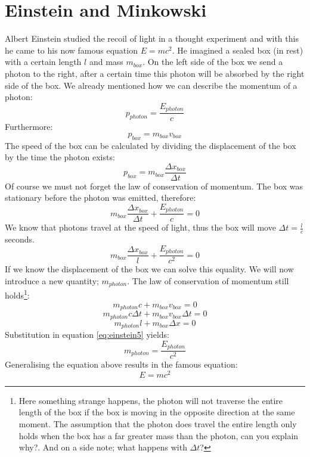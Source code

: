 \section{Einstein and Minkowski}
Albert Einstein studied the recoil of light in a thought experiment and with this he came to his now famous equation $ E=mc^2$. He imagined a sealed box (in rest) with a certain length $l$ and mass $m_{box}$. On the left side of the box we send a photon to the right, after a certain time this photon will be absorbed by the right side of the box. We already mentioned how we can describe the momentum of a photon:
\begin{equation}\label{eq:einstein1}
p_{photon}=\frac{E_{photon}}{c}
\end{equation}
Furthermore:
\begin{equation}\label{eq:einstein2}
p_{box}=m_{box} v_{box}
\end{equation}
The speed of the box can be calculated by dividing the displacement of the box by the time the photon exists:
\begin{equation}\label{eq:einstein3}
p_{box}=m_{box} \frac{\Delta x_{box}}{\Delta t}
\end{equation}
Of course we must not forget the law of conservation of momentum. The box was stationary before the photon was emitted, therefore:
\begin{equation}\label{eq:einstein4}
m_{box} \frac{\Delta x_{box}}{\Delta t} + \frac{E_{photon}}{c} =0
\end{equation}
We know that photons travel at the speed of light, thus the box will move $\Delta t = \frac{l}{c}$ seconds.
\begin{equation}\label{eq:einstein5}
m_{box} \frac{\Delta x_{box}}{l} + \frac{E_{photon}}{c^2} =0
\end{equation}
If we know the displacement of the box we can solve this equality. We will now introduce a new quantity; $m_{photon}$. The law of conservation of momentum still holds\footnote{Here something strange happens, the photon will not traverse the entire length of the box if the box is moving in the opposite direction at the same moment. The assumption that the photon does travel the entire length only holds when the box has a far greater mass than the photon, can you explain why?. And on a side note; what happens with $\Delta t$?}:
\begin{equation}\label{eq:einstein6}
m_{photon} c + m_{box} v_{box} = 0
\end{equation}
\begin{equation}\label{eq:einstein7}
m_{photon} c \Delta t + m_{box} v_{box} \Delta t = 0
\end{equation}
\begin{equation}\label{eq:einstein8}
m_{photon} l + m_{box} \Delta x = 0
\end{equation}
Substitution in equation \ref{eq:einstein5} yields:
\begin{equation}\label{eq:einstein9}
m_{photon} = \frac{E_{photon}}{c^2}
\end{equation}
Generalising the equation above results in the famous equation:
\begin{equation}\label{eq:einstein10}
E=mc^2	
\end{equation}

